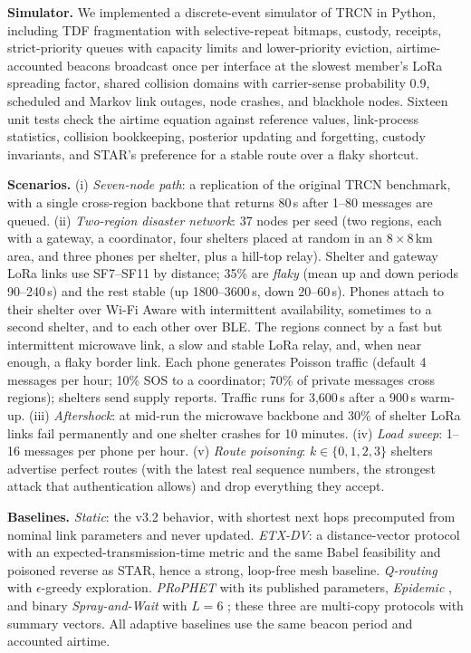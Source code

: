 \documentclass[jou,a4paper,11pt,floatsintext]{apa7}
\begin{document}
\textbf{Simulator.} We implemented a discrete-event simulator of TRCN in Python, including TDF fragmentation with selective-repeat bitmaps, custody, receipts, strict-priority queues with capacity limits and lower-priority eviction, airtime-accounted beacons broadcast once per interface at the slowest member's LoRa spreading factor, shared collision domains with carrier-sense probability 0.9, scheduled and Markov link outages, node crashes, and blackhole nodes. Sixteen unit tests check the airtime equation against reference values, link-process statistics, collision bookkeeping, posterior updating and forgetting, custody invariants, and STAR's preference for a stable route over a flaky shortcut.

\textbf{Scenarios.} (i) \emph{Seven-node path}: a replication of the original TRCN benchmark, with a single cross-region backbone that returns 80\,s after 1--80 messages are queued. (ii) \emph{Two-region disaster network}: 37 nodes per seed (two regions, each with a gateway, a coordinator, four shelters placed at random in an $8\times8$\,km area, and three phones per shelter, plus a hill-top relay). Shelter and gateway LoRa links use SF7--SF11 by distance; 35\% are \emph{flaky} (mean up and down periods 90--240\,s) and the rest stable (up 1800--3600\,s, down 20--60\,s). Phones attach to their shelter over Wi-Fi Aware with intermittent availability, sometimes to a second shelter, and to each other over BLE. The regions connect by a fast but intermittent microwave link, a slow and stable LoRa relay, and, when near enough, a flaky border link. Each phone generates Poisson traffic (default 4 messages per hour; 10\% SOS to a coordinator; 70\% of private messages cross regions); shelters send supply reports. Traffic runs for 3{,}600\,s after a 900\,s warm-up. (iii) \emph{Aftershock}: at mid-run the microwave backbone and 30\% of shelter LoRa links fail permanently and one shelter crashes for 10 minutes. (iv) \emph{Load sweep}: 1--16 messages per phone per hour. (v) \emph{Route poisoning}: $k\in\{0,1,2,3\}$ shelters advertise perfect routes (with the latest real sequence numbers, the strongest attack that authentication allows) and drop everything they accept.

\textbf{Baselines.} \emph{Static}: the v3.2 behavior, with shortest next hops precomputed from nominal link parameters and never updated. \emph{ETX-DV}: a distance-vector protocol with an expected-transmission-time metric \parencite{decouto2003} and the same Babel feasibility and poisoned reverse as STAR, hence a strong, loop-free mesh baseline. \emph{Q-routing} \parencite{boyan1994} with $\epsilon$-greedy exploration. \emph{PRoPHET} \parencite{lindgren2003} with its published parameters, \emph{Epidemic} \parencite{vahdat2000}, and binary \emph{Spray-and-Wait} with $L=6$ \parencite{spyropoulos2005}; these three are multi-copy protocols with summary vectors. All adaptive baselines use the same beacon period and accounted airtime.
\end{document}
